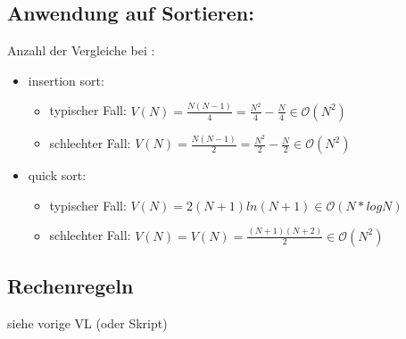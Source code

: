 \documentclass[11pt, fleqn]{scrreprt}
\newcommand{\bigO}[0]{\mathcal{O}}
\begin{document}
\subsection*{Anwendung auf Sortieren:}
Anzahl der Vergleiche bei :
\begin{itemize}
    \item insertion sort:
    \begin{itemize}
        \item typischer Fall: $V(N)= \frac{N(N-1)}{4} = \frac{N^2}{4} - \frac{N}{4} \in \bigO{}(N^2)$ \\
        \item schlechter Fall: $V(N) = \frac{N(N-1)}{2} = \frac{N^2}{2} - \frac{N}{2} \in  \bigO{}(N^2) $\\
    \end{itemize}
    \item quick sort:
    \begin{itemize}
        \item typischer Fall: $V(N) = 2(N+1) ln(N+1) \in \bigO{}(N*log N)$
        \item schlechter Fall: $V(N) = V(N) = \frac{(N+1)(N+2)}{2} \in \bigO{}(N^2) $\\
    \end{itemize}
\end{itemize}

\subsection*{Rechenregeln}
siehe vorige VL (oder Skript)
\end{document}
